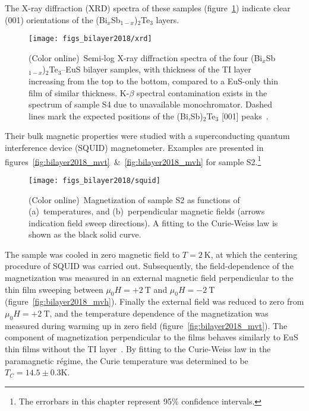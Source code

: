 The X-ray diffraction (XRD) spectra of these samples (figure~\ref{fig:bilayer2018_xrd}) indicate clear (001) orientations of the (Bi$_{x}$Sb$_{1-x}$)$_2$Te$_3$ layers.%
%
\begin{figure}[ht]%
    \centering%
    \texttt{[image: figs\_bilayer2018/xrd]}%
    \caption[X-Ray diffraction spectra of (Bi$_{x}$Sb$_{1-x}$)$_2$Te$_3$--EuS bilayers.]{\label{fig:bilayer2018_xrd}(Color online)~Semi-log X-ray diffraction spectra of the four (Bi$_{x}$Sb$_{1-x}$)$_2$Te$_3$--EuS bilayer samples, with thickness of the TI layer increasing from the top to the bottom, compared to a EuS-only thin film of similar thickness. K-$\beta$ spectral contamination exists in the spectrum of sample S4 due to unavailable monochromator. Dashed lines mark the expected positions of the (Bi,Sb)$_2$Te$_3$ [001] peaks~\protect\cite{SbStructure}.}%
\end{figure} %
%
Their bulk magnetic properties were studied with a superconducting quantum interference device (SQUID) magnetometer. Examples are presented in figures~\ref{fig:bilayer2018_mvt}~\&~\ref{fig:bilayer2018_mvh} for sample S2.\footnote{The errorbars in this chapter represent 95\% confidence intervals.}%
\begin{figure}[ht]%
    \centering%
    \texttt{[image: figs\_bilayer2018/squid]}%
    \subfloat{\label{fig:bilayer2018_mvt}}%
    \subfloat{\label{fig:bilayer2018_mvh}}%
    \caption[SQUID magnetometry of (Bi$_{x}$Sb$_{1-x}$)$_2$Te$_3$--EuS bilayers.]{\label{fig:bilayer2018_squid}(Color online)~Magnetization of sample S2 as functions of (a)~temperatures, and (b)~perpendicular magnetic fields (arrows indication field sweep directions). A fitting to the Curie-Weiss law is shown as the black solid curve.}%
\end{figure} %
%
The sample was cooled in zero magnetic field to $T=2~\mathrm{K}$, at which the centering procedure of SQUID was carried out. Subsequently, the field-dependence of the magnetization was measured in an external magnetic field perpendicular to the thin film sweeping between $\mu_0H = +2~\mathrm{T}$ and $\mu_0H = -2~\mathrm{T}$ (figure~\ref{fig:bilayer2018_mvh}). Finally the external field was reduced to zero from $\mu_0H = +2~\mathrm{T}$, and the temperature dependence of the magnetization was measured during warming up in zero field (figure~\ref{fig:bilayer2018_mvt}). The component of magnetization perpendicular to the films behaves similarly to EuS thin films without the TI layer~\cite{EuS_PLD}. By fitting to the Curie-Weiss law in the paramagnetic r\'egime, the Curie temperature was determined to be $T_C = 14.5\pm0.3\mathrm{K}$.


